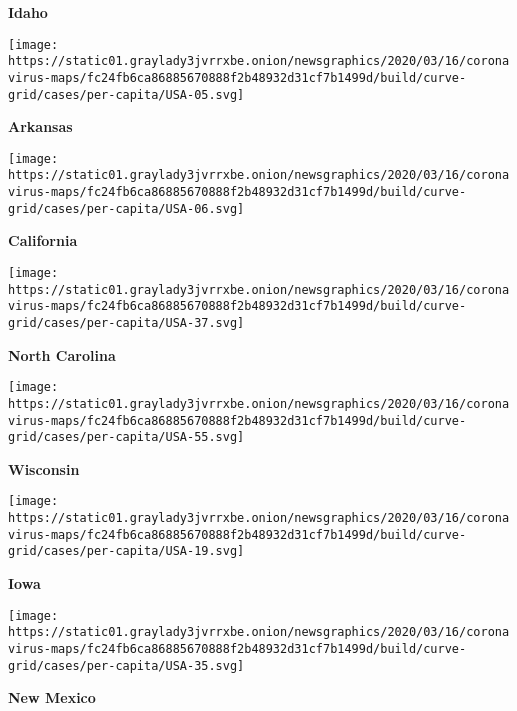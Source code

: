 \textbf{Idaho}

\href{https://www.nytimes3xbfgragh.onion/interactive/2020/us/arkansas-coronavirus-cases.html}{}

\texttt{[image: https://static01.graylady3jvrrxbe.onion/newsgraphics/2020/03/16/coronavirus-maps/fc24fb6ca86885670888f2b48932d31cf7b1499d/build/curve-grid/cases/per-capita/USA-05.svg]}

\textbf{Arkansas}

\href{https://www.nytimes3xbfgragh.onion/interactive/2020/us/california-coronavirus-cases.html}{}

\texttt{[image: https://static01.graylady3jvrrxbe.onion/newsgraphics/2020/03/16/coronavirus-maps/fc24fb6ca86885670888f2b48932d31cf7b1499d/build/curve-grid/cases/per-capita/USA-06.svg]}

\textbf{California}

\href{https://www.nytimes3xbfgragh.onion/interactive/2020/us/north-carolina-coronavirus-cases.html}{}

\texttt{[image: https://static01.graylady3jvrrxbe.onion/newsgraphics/2020/03/16/coronavirus-maps/fc24fb6ca86885670888f2b48932d31cf7b1499d/build/curve-grid/cases/per-capita/USA-37.svg]}

\textbf{North Carolina}

\href{https://www.nytimes3xbfgragh.onion/interactive/2020/us/wisconsin-coronavirus-cases.html}{}

\texttt{[image: https://static01.graylady3jvrrxbe.onion/newsgraphics/2020/03/16/coronavirus-maps/fc24fb6ca86885670888f2b48932d31cf7b1499d/build/curve-grid/cases/per-capita/USA-55.svg]}

\textbf{Wisconsin}

\href{https://www.nytimes3xbfgragh.onion/interactive/2020/us/iowa-coronavirus-cases.html}{}

\texttt{[image: https://static01.graylady3jvrrxbe.onion/newsgraphics/2020/03/16/coronavirus-maps/fc24fb6ca86885670888f2b48932d31cf7b1499d/build/curve-grid/cases/per-capita/USA-19.svg]}

\textbf{Iowa}

\href{https://www.nytimes3xbfgragh.onion/interactive/2020/us/new-mexico-coronavirus-cases.html}{}

\texttt{[image: https://static01.graylady3jvrrxbe.onion/newsgraphics/2020/03/16/coronavirus-maps/fc24fb6ca86885670888f2b48932d31cf7b1499d/build/curve-grid/cases/per-capita/USA-35.svg]}

\textbf{New Mexico}

